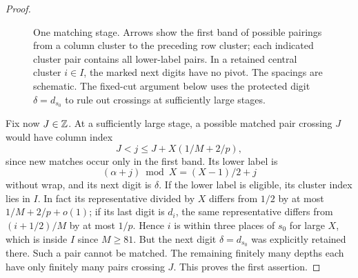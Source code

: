 \begin{proof}
\begin{figure}[H]
\centering
{}
\caption{One matching stage. Arrows show the first band of possible
pairings from a column cluster to the preceding row cluster; each
indicated cluster pair contains all lower-label pairs. In a retained
central cluster $i\in I$, the marked next digits have no pivot. The
spacings are schematic. The fixed-cut argument below uses the protected
digit $\delta=d_{s_0}$ to rule out crossings at sufficiently large
stages.}
\label{op:matching-figure}
\end{figure}

Fix now $J\in\mathbb Z$. At a sufficiently large stage, a possible matched
pair crossing $J$ would have column index
\[
 J<j\le J+X(1/M+2/p),
\]
since new matches occur only in the first band. Its lower label is
\[
 (\alpha+j)\bmod X=(X-1)/2+j
\]
without wrap, and its next digit is $\delta$. If the lower label is
eligible, its cluster index lies in $I$. In fact its representative
divided by $X$ differs from $1/2$ by at most
$1/M+2/p+o(1)$; if its last digit is $d_i$, the same representative
differs from $(i+1/2)/M$ by at most $1/p$. Hence $i$ is within three
places of $s_0$ for large $X$, which is inside $I$ since $M\ge81$.
But the next digit $\delta=d_{s_0}$ was explicitly retained there.
Such a pair cannot be matched. The remaining finitely many depths
each have only finitely many pairs crossing $J$. This proves the
first assertion.


\end{proof}
